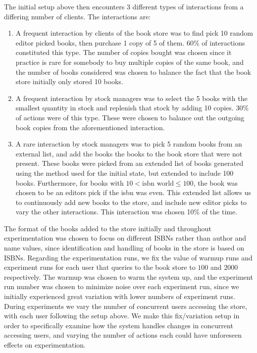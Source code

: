 \documentclass{article}
\begin{document}
The initial setup above then encounters 3 different types of interactions from a differing number of clients. The interactions are:
\begin{enumerate}
	\item A frequent interaction by clients of the book store was to find pick 10 random editor picked books, then purchase 1 copy of 5 of them. 60\% of interactions constituted this type. The number of copies bought was chosen since it practice is rare for somebody to buy multiple copies of the same book, and the number of books considered was chosen to balance the fact that the book store initially only stored 10 books.
	\item A frequent interaction by stock managers was to select the 5 books with the smallest quantity in stock and replenish that stock by adding 10 copies. 30\% of actions were of this type. These were chosen to balance out the outgoing book copies from the aforementioned interaction.
	\item A rare interaction by stock managers was to pick 5 random books from an external list, and add the books the books to the book store that were not present. These books were picked from an extended list of books generated using the method used for the initial state, but extended to include 100 books. Furthermore, for books with $10 < \text{isbn world} \leq 100$, the book was chosen to be an editors pick if the isbn was even. This extended list allows us to continuously add new books to the store, and include new editor picks to vary the other interactions. This interaction was chosen 10\% of the time.
\end{enumerate}
The format of the books added to the store initially and throughout experimentation was chosen to focus on different ISBNs rather than author and name values, since identification and handling of books in the store is based on ISBNs. Regarding the experimentation runs, we fix the value of warmup runs and experiment runs for each user that queries to the book store to $100$ and $2000$ respectively. The warmup was chosen to warm the system up, and the experiment run number was chosen to minimize noise over each experiment run, since we initially experienced great variation with lower numbers of experiment runs. During experiments we vary the number of concurrent users accessing the store, with each user following the setup above. We make this fix/variation setup in order to specifically examine how the system handles changes in concurrent accessing users, and varying the number of actions each could have unforeseen effects on experimentation.
\end{document}
